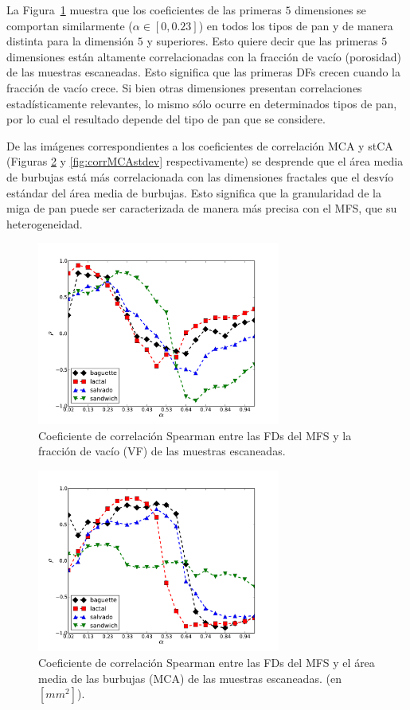 La Figura~\ref{fig:corrVF} muestra que los coeficientes de las primeras $5$ dimensiones se comportan similarmente ($\alpha \in [0,0.23]$) en todos los tipos de pan y de manera distinta para la dimensión $5$ y superiores. Esto quiere decir que las primeras $5$ dimensiones están altamente correlacionadas con la fracción de vacío (porosidad) de las muestras escaneadas.
Esto significa que las primeras DFs crecen cuando la fracción de vacío crece.
Si bien otras dimensiones presentan correlaciones estadísticamente relevantes, lo mismo sólo ocurre en determinados tipos de pan, por lo cual el resultado depende del tipo de pan que se considere.

De las imágenes correspondientes a los coeficientes de correlación MCA y stCA (Figuras \ref{fig:corrMCA} y \ref{fig:corrMCAstdev} respectivamente) se desprende que el área media de burbujas está más correlacionada con las dimensiones fractales que el desvío estándar del área media de burbujas. Esto significa que la granularidad de la miga de pan puede ser caracterizada de manera más precisa con el MFS, que su heterogeneidad.


\begin{figure}[h!]
\centering
\includegraphics[width=8cm]{figures/VF}
\caption{Coeficiente de correlación Spearman entre las FDs del MFS y la fracción de vacío (VF) de las muestras escaneadas.}
\label{fig:corrVF}
\end{figure}

\begin{figure}[h!]
\centering
\includegraphics[width=8cm]{figures/MCA}
\caption{Coeficiente de correlación Spearman entre las FDs del MFS y el área media de las burbujas (MCA) de las muestras escaneadas. (en $[mm^{2}]$).}
\label{fig:corrMCA}
\end{figure}

